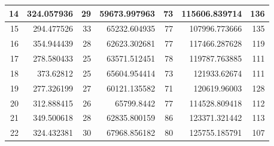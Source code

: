 \begin{table}
\begin{adjustwidth}{}{}
{{\begin{tabular}{|r|r|r|r|r|r|r|}
	\hline
	14                                         & 324.057936                   & 29                                    & 59673.997963                   & 73                                    & 115606.839714                & 136                                    \\ 
	\hline
	15                                         & 294.477526                   & 33                                    & 65232.604935                   & 77                                    & 107996.773666                & 135                                    \\ 
	\hline
	16                                         & 354.944439                   & 28                                    & 62623.302681                   & 77                                    & 117466.287628                & 119                                    \\ 
	\hline
	17                                         & 278.580433                   & 25                                    & 63571.512451                   & 78                                    & 119787.763885                & 111                                    \\ 
	\hline
	18                                         & 373.62812                    & 25                                    & 65604.954414                   & 73                                    & 121933.62674                 & 111                                    \\ 
	\hline
	19                                         & 277.326199                   & 27                                    & 60121.135582                   & 71                                    & 120619.96003                 & 128                                    \\ 
	\hline
	20                                         & 312.888415                   & 26                                    & 65799.8442                     & 77                                    & 114528.809418                & 112                                    \\ 
	\hline
	21                                         & 349.500618                   & 28                                    & 62835.800159                   & 86                                    & 123371.321442                & 113                                    \\ 
	\hline
	22                                         & 324.432381                   & 30                                    & 67968.856182                   & 80                                    & 125755.185791                & 107                                    \\ 

\end{tabular}}}
\end{adjustwidth}
\end{table}
